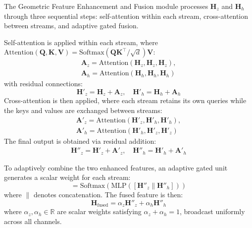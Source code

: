 \documentclass[letterpaper,journal]{IEEEtran}
\begin{document}
The Geometric Feature Enhancement and Fusion module processes $\mathbf{H}_z$ and $\mathbf{H}_h$ through three sequential steps: self-attention within each stream, cross-attention between streams, and adaptive gated fusion.

Self-attention is applied within each stream, where $\text{Attention}(\mathbf{Q}, \mathbf{K}, \mathbf{V}) = \text{Softmax}(\mathbf{Q}\mathbf{K}^\top / \sqrt{d})\mathbf{V}$:
\begin{equation}
\begin{aligned}
\mathbf{A}_z = \text{Attention}(\mathbf{H}_z, \mathbf{H}_z, \mathbf{H}_z), \\
\mathbf{A}_h = \text{Attention}(\mathbf{H}_h, \mathbf{H}_h, \mathbf{H}_h)
\end{aligned}
\end{equation}
with residual connections:
\begin{equation}
\mathbf{H}'_z = \mathbf{H}_z + \mathbf{A}_z, \quad \mathbf{H}'_h = \mathbf{H}_h + \mathbf{A}_h
\end{equation}
Cross-attention is then applied, where each stream retains its own queries while the keys and values are exchanged between streams:
\begin{equation}
\begin{aligned}
\mathbf{A}'_z = \text{Attention}(\mathbf{H}'_z, \mathbf{H}'_h, \mathbf{H}'_h), \\
\mathbf{A}'_h = \text{Attention}(\mathbf{H}'_h, \mathbf{H}'_z, \mathbf{H}'_z)
\end{aligned}
\end{equation}
The final output is obtained via residual addition:
\begin{equation}
\begin{aligned}
\mathbf{H}''_z = \mathbf{H}'_z + \mathbf{A}'_z, \quad \mathbf{H}''_h = \mathbf{H}'_h + \mathbf{A}'_h
\end{aligned}
\end{equation}

To adaptively combine the two enhanced features, an adaptive gated unit generates a scalar weight for each stream:
\begin{equation}
[\alpha_z, \alpha_h] = \text{Softmax}(\text{MLP}([\mathbf{H}''_z \| \mathbf{H}''_h]))
\end{equation}
where $\|$ denotes concatenation. The fused feature is then:
\begin{equation}
\mathbf{H}_{\text{fused}} = \alpha_z \mathbf{H}''_z + \alpha_h \mathbf{H}''_h
\end{equation}
where $\alpha_z, \alpha_h \in \mathbb{R}$ are scalar weights satisfying $\alpha_z + \alpha_h = 1$, broadcast uniformly across all channels.
\end{document}
